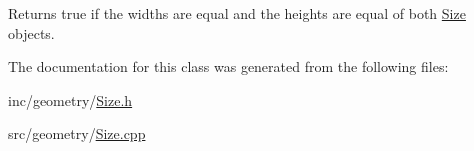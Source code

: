 Returns true if the widths are equal and the heights are equal of both \hyperlink{classprism_1_1geometry_1_1_size}{Size} objects. 

The documentation for this class was generated from the following files\+:\begin{DoxyCompactItemize}
\item 
inc/geometry/\hyperlink{_size_8h}{Size.\+h}\item 
src/geometry/\hyperlink{_size_8cpp}{Size.\+cpp}\end{DoxyCompactItemize}
